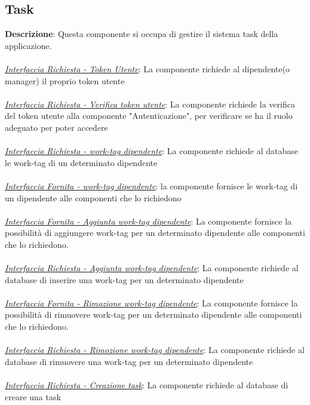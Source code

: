 \documentclass{report}
\begin{document}
\subsection*{Task}

\textbf{Descrizione}: Questa componente si occupa di gestire il sistema task della applicazione.\\\\
\uline{\textit{Interfaccia Richiesta - Token Utente}}:
La componente richiede al dipendente(o manager) il proprio token utente \\ \\
\uline{\textit{Interfaccia Richiesta - Verifica token utente}}: 
La componente richiede la verifica del token utente alla componente "Autenticazione", per verificare se ha il ruolo adeguato per poter accedere \\ \\ 
\uline{\textit{Interfaccia Richiesta - work-tag dipendente}}: 
La componente richiede al database le work-tag di un determinato dipendente \\ \\
\uline{\textit{Interfaccia Fornita - work-tag dipendente}}: 
la componente fornisce le work-tag di un dipendente alle componenti che lo richiedono\\ \\
\uline{\textit{Interfaccia Fornita - Aggiunta work-tag dipendente}}: 
La componente fornisce la possibilità di aggiungere work-tag per un determinato dipendente alle componenti che lo richiedono.\\ \\
\uline{\textit{Interfaccia Richiesta - Aggiunta work-tag dipendente}}: 
La componente richiede al database di inserire una work-tag per un determinato dipendente\\ \\ 
\uline{\textit{Interfaccia Fornita - Rimozione work-tag dipendente}}: 
La componente fornisce la possibilità di rimuovere work-tag per un determinato dipendente alle componenti che lo richiedono.\\ \\ 
\uline{\textit{Interfaccia Richiesta - Rimozione work-tag dipendente}}:  
La componente richiede al database di rimuovere una work-tag per un determinato dipendente \\ \\ 
\uline{\textit{Interfaccia Richiesta - Creazione task}}:
La componente richiede al database di creare una task \\\\
\end{document}
